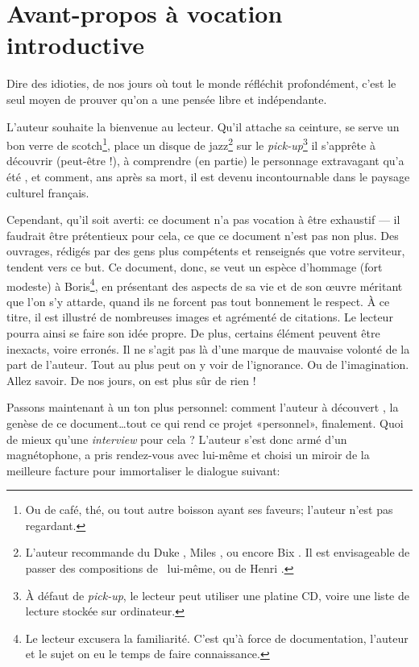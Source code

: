 \frontmatter

\chapter{Avant-propos à vocation introductive}
\epigraph{Dire des idioties, de nos jours où tout le monde réfléchit profondément, c'est le seul moyen de prouver qu'on a une pensée libre et indépendante.}{\BV}
\vfill
\pagebreak

L'auteur souhaite la bienvenue au lecteur. Qu'il attache sa ceinture,
se serve un bon verre de scotch\footnote{Ou de café, thé, ou tout autre
boisson ayant ses faveurs; l'auteur n'est pas regardant.}, place un
disque de jazz\footnote{L'auteur recommande du Duke , 
Miles , ou encore Bix . Il est envisageable de
passer des compositions de \BV\ lui-même, ou de Henri .}
sur le \emph{pick-up}\footnote{À défaut de \emph{pick-up},
le lecteur peut utiliser une platine CD, voire une liste de lecture
stockée sur ordinateur.}
il s'apprête à découvrir (peut-être !), à comprendre (en partie) le
personnage extravagant qu'a été \BV, et comment,  ans après
sa mort, il est devenu incontournable dans le paysage culturel français.

Cependant, qu'il soit averti: ce document n'a pas vocation à être exhaustif
--- il faudrait être prétentieux pour cela, ce que ce document n'est pas
non plus. Des ouvrages, rédigés par des gens plus compétents et renseignés
que votre serviteur, tendent vers ce but.
Ce document, donc, se veut un espèce d'hommage (fort modeste) à
Boris\footnote{Le lecteur excusera la familiarité. C'est qu'à force de
documentation, l'auteur et le sujet on eu le temps de faire connaissance.},
en présentant des aspects de sa vie et de son \oe{}uvre méritant
que l'on s'y attarde, quand ils ne forcent pas tout bonnement le respect.
À ce titre, il est illustré de nombreuses images et agrémenté
de citations. Le lecteur pourra ainsi se faire son idée propre. De plus, 
certains élément peuvent être inexacts, voire erronés. Il ne
s'agit pas là d'une marque de mauvaise volonté de la part de l'auteur. Tout
au plus peut on y voir de l'ignorance. Ou de l'imagination. Allez savoir.
De nos jours, on est plus sûr de rien !


Passons maintenant à un ton plus personnel: comment l'auteur à
 découvert \BV, la genèse de ce document\ldots tout ce qui rend ce projet «personnel», finalement.
Quoi de mieux qu'une \emph{interview} pour cela ?
L'auteur s'est donc armé d'un magnétophone, a pris rendez-vous avec lui-même
et choisi un miroir de la meilleure facture pour immortaliser le dialogue suivant:

